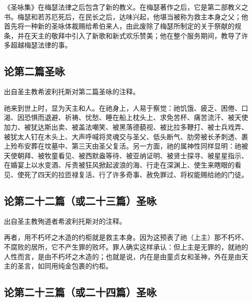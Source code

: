 《圣咏集》在梅瑟法律之后包含了新的教义。在梅瑟著作之后，它是第二部教义之书。梅瑟和若苏厄死后，在民长之后，达味兴起，他堪当被称为救主本身之父；他首先将一种新的圣咏体裁赐给希伯来人，由此废除了梅瑟所制定的关于祭献的规条，并在天主的敬拜中引入了新歌和新式欢乐赞美；他在整个服务期间，教导了许多超越梅瑟法律的事。\par


\subsection{论第二篇圣咏}

出自圣主教希波利托斯对第二篇圣咏的注释。\par

祂来到世上时，显为天主和人。在祂身上，人易于察觉：祂饥饿、疲乏、困倦、口渴、因恐惧而退避、祈祷、忧愁、睡在船上枕头上、求免苦杯、痛苦流汗、被天使加力、被犹达斯出卖、被盖法嘲笑、被黑落德藐视、被比拉多鞭打、被士兵戏弄、被犹太人钉在木头上、大声呼喊将灵魂交与圣父、低头断气、肋旁被长矛刺透、裹上殓布安葬在坟墓中、第三天由圣父复活。另一方面，祂的属神性同样显明：祂被天使朝拜、被牧童看见、被西默盎等待、被亚纳证明、被贤士探寻、被星星指示、在婚宴上以水变酒、斥责被狂风掀起波浪的海、行走在深渊上、使生来瞎眼的看见、使死了四天的拉匝禄复活、行了许多奇事、赦免罪过、将权能赐给祂的门徒。\par


\subsection{论第二十二篇（或二十三篇）圣咏}

出自圣主教殉道者希波利托斯对的注释。\par

再者，用不朽坏之木造的约柜就是救主本身。因为这预表了祂（上主）那不朽坏、不腐败的居所，它不产生罪的败坏。罪人确实这样承认：但上主是无罪的，就祂的人性而言，是由不朽坏之木造的；也就是说，内在是由童贞女和圣神，外在是由天主的圣言，如同用纯金包裹的约柜。\par


\subsection{论第二十三篇（或二十四篇）圣咏}

